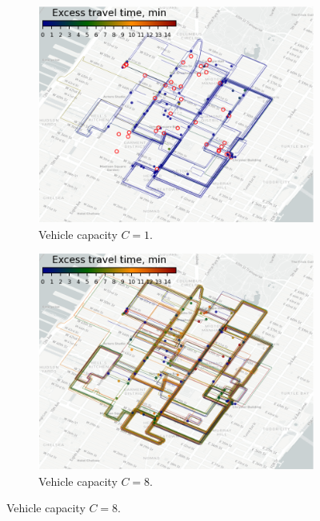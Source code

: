 \documentclass[12pt,notitlepage]{article}
\begin{document}
\begin{figure}[!p]
	\begin{subfigure}{0.5\textwidth}
		\includegraphics[width=\textwidth]{20210616-OPT1/c_grid_study0/UTC-20210619-074952/c_grid_visualize/8/excess_travel_time_traj}
		\caption{Vehicle capacity $C = 1$.}
	\end{subfigure}
	\begin{subfigure}{0.5\textwidth}
		\includegraphics[width=\textwidth]{20210616-OPT1/c_grid_study0/UTC-20210619-074952/c_grid_visualize/9/excess_travel_time_traj}
		\caption{Vehicle capacity $C = 8$.}
	\end{subfigure}
	

\end{figure}
\end{document}
